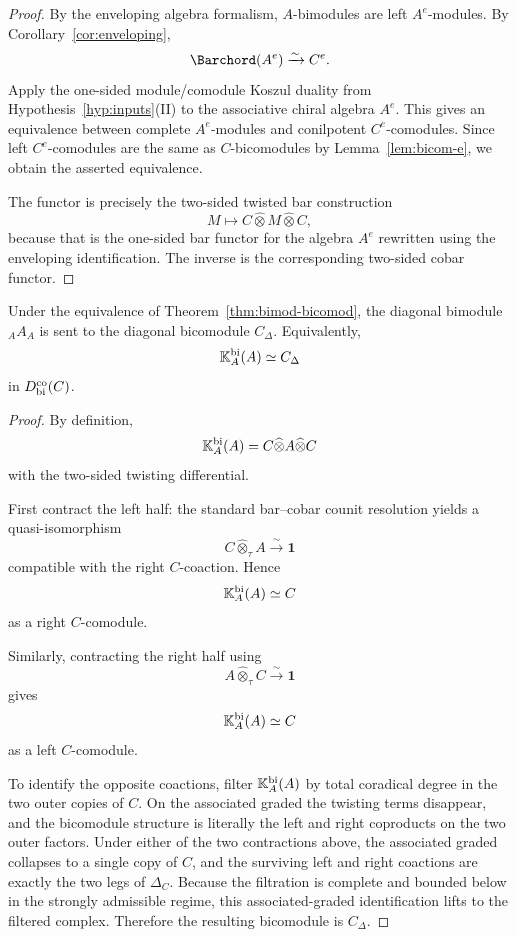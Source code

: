 \begin{proof}
By the enveloping algebra formalism, $A$-bimodules are left $A^e$-modules.
By Corollary~\ref{cor:enveloping},
\[
\Barchord(A^e)\xrightarrow{\sim} C^e.
\]
Apply the one-sided module/comodule Koszul duality from Hypothesis~\ref{hyp:inputs}(II) to the
associative chiral algebra $A^e$. This gives an equivalence between complete $A^e$-modules and
conilpotent $C^e$-comodules. Since left $C^e$-comodules are the same as $C$-bicomodules by
Lemma~\ref{lem:bicom-e}, we obtain the asserted equivalence.

The functor is precisely the two-sided twisted bar construction
\[
M\longmapsto C\widehat\otimes M\widehat\otimes C,
\]
because that is the one-sided bar functor for the algebra $A^e$ rewritten using the enveloping
identification. The inverse is the corresponding two-sided cobar functor.
\end{proof}

\begin{theorem}
\ClaimStatusProvedHere
\label{thm:diagonal}
Under the equivalence of Theorem~\ref{thm:bimod-bicomod}, the diagonal bimodule ${}_A A_A$ is sent
to the diagonal bicomodule $C_\Delta$. Equivalently,
\[
\mathbb{K}_A^{\mathrm{bi}}(A)\simeq C_\Delta
\]
in $D^{\mathrm{co}}_{\mathrm{bi}}(C)$.
\end{theorem}

\begin{proof}
By definition,
\[
\mathbb{K}_A^{\mathrm{bi}}(A)=C\widehat\otimes A\widehat\otimes C
\]
with the two-sided twisting differential.

First contract the left half:
the standard bar--cobar counit resolution yields a quasi-isomorphism
\[
C\widehat\otimes_\tau A\xrightarrow{\sim} \mathbf 1
\]
compatible with the right $C$-coaction. Hence
\[
\mathbb{K}_A^{\mathrm{bi}}(A)\simeq C
\]
as a right $C$-comodule.

Similarly, contracting the right half using
\[
A\widehat\otimes_\tau C\xrightarrow{\sim}\mathbf 1
\]
gives
\[
\mathbb{K}_A^{\mathrm{bi}}(A)\simeq C
\]
as a left $C$-comodule.

To identify the opposite coactions, filter $\mathbb{K}_A^{\mathrm{bi}}(A)$ by total coradical degree in the
two outer copies of $C$. On the associated graded the twisting terms disappear, and the bicomodule
structure is literally the left and right coproducts on the two outer factors. Under either of the
two contractions above, the associated graded collapses to a single copy of $C$, and the surviving
left and right coactions are exactly the two legs of $\Delta_C$. Because the filtration is complete
and bounded below in the strongly admissible regime, this associated-graded identification lifts to
the filtered complex. Therefore the resulting bicomodule is $C_\Delta$.
\end{proof}

